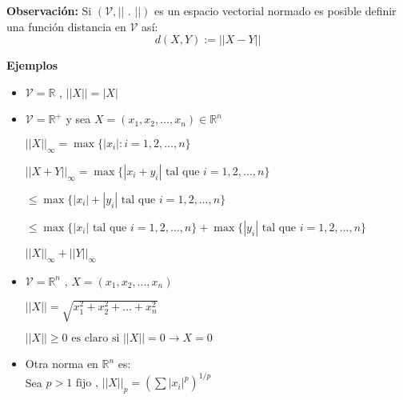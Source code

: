 \documentclass[12pt]{article}
\begin{document}
\noindent \textbf{Observación:} Si $(\mathcal{V}, || \text{ . } ||)$ es un espacio vectorial normado es posible definir una función distancia en $\mathcal{V}$ así:
$$d(X,Y) := ||X-Y||$$

\noindent \textbf{Ejemplos}
\begin{itemize}
    \item $\mathcal{V} = \mathbb{R}$ , $||X||= |X|$ \\
    \item $\mathcal{V} = \mathbb{R}^+$ y sea $X = (x_1 , x_2, \dots , x_n) \in \mathbb{R}^n $
    
    $||X||_\infty = \max \{ |x_i| : i = 1,2, \dots, n\}$
    
    $||X + Y||_\infty = \max \{ |x_i + y_i| \text{ tal que } i=1,2,\dots,n\}$
    
    $\leq \max \{ |x_i| + |y_i| \text{ tal que } i=1,2,\dots,n\}$
    
    $\leq \max \{ |x_i| \text{ tal que } i=1,2,\dots,n\} + \max \{ |y_i| \text{ tal que } i=1,2,\dots,n\}$
    
    $||X||_\infty + ||Y||_\infty$\\
    \item $\mathcal{V} = \mathbb{R}^n \text{ , } X = (x_1,x_2,\dots,x_n)$ 

    $||X|| = \sqrt{x_{1}^2 + x_{2}^2 + \dots + x_{n}^2}$

    $||X|| \geq 0 \text{ es claro si } ||X|| = 0 \rightarrow X=0$ \\

    \item Otra norma en $\mathbb{R}^n$ es: \\
    Sea $p > 1 \text{ fijo , } ||X||_p = (\sum |x_i| ^p) ^ {1/p}$
\end{itemize}
\end{document}
